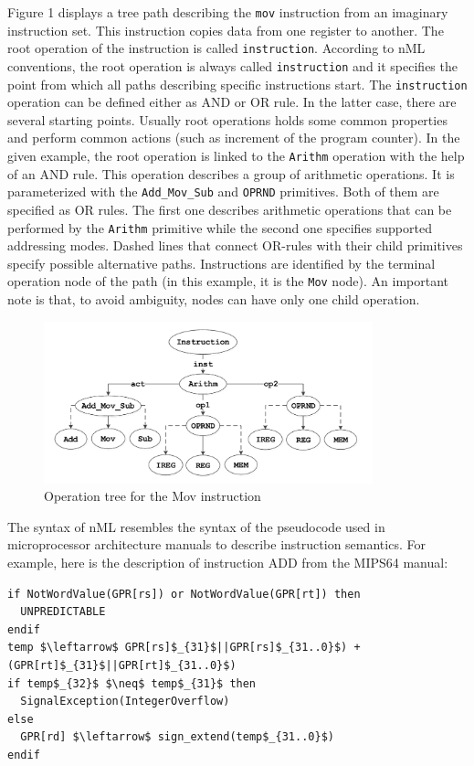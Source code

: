 \documentclass[oneside,final,14pt]{extreport}
\begin{document}
Figure 1 displays a tree path describing the {\tt mov} instruction from an
imaginary instruction set. This instruction copies data from one register to
another. The root operation of the instruction is called {\tt instruction}.
According to nML conventions, the root operation is always called {\tt instruction}
and it specifies the point from which all paths describing specific
instructions start. The {\tt instruction} operation can be defined either as AND or
OR rule. In the latter case, there are several starting points. Usually root
operations holds some common properties and perform common actions (such as
increment of the program counter). In the given example, the root operation is
linked to the {\tt Arithm} operation with the help of an AND rule. This operation
describes a group of arithmetic operations. It is parameterized with the
{\tt Add{\_}Mov{\_}Sub} and {\tt OPRND} primitives. Both of them are specified as OR rules.
The first one describes arithmetic operations that can be performed by the
{\tt Arithm} primitive while the second one specifies supported addressing modes.
Dashed lines that connect OR-rules with their child primitives specify possible
alternative paths. Instructions are identified by the terminal operation node of
the path (in this example, it is the {\tt Mov} node). An important note is that, to
avoid ambiguity, nodes can have only one child operation.

\begin{figure}
\centering
\includegraphics [width=0.85\textwidth]
{figures/figure1.pdf}
\caption{Operation tree for the Mov instruction}
\label{nml-instruction-tree}
\end{figure}

The syntax of nML resembles the syntax of the pseudocode used in microprocessor
architecture manuals to describe instruction semantics. For example, here is the
description of instruction ADD from the MIPS64 manual:

\begin{lstlisting}[mathescape=true]
if NotWordValue(GPR[rs]) or NotWordValue(GPR[rt]) then
  UNPREDICTABLE
endif
temp $\leftarrow$ GPR[rs]$_{31}$||GPR[rs]$_{31..0}$) + (GPR[rt]$_{31}$||GPR[rt]$_{31..0}$)
if temp$_{32}$ $\neq$ temp$_{31}$ then
  SignalException(IntegerOverflow)
else
  GPR[rd] $\leftarrow$ sign_extend(temp$_{31..0}$)
endif
\end{lstlisting}
\end{document}
